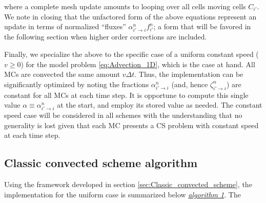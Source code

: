 \documentclass[11pt,titlepage]{report}
\begin{document}
\noindent where a complete mesh update amounts to looping over all cells moving cells $C_{i'}$. We note in closing that the unfactored form of the above equations represent an update in terms of normalized ``fluxes'' $\alpha_{i'\to i}^n f_{i'}^n$; a form that will be favored in the following section when higher order corrections are included.

Finally, we specialize the above to the specific case of a uniform constant speed ($v \geq 0$) for the model problem \eqref{eq:Advection_1D}, which is the case at hand. All MCs are convected the same amount $v\Delta t$. Thus, the implementation can be significantly optimized by noting the fractions $\alpha_{i'\to i}^n$ (and, hence $\zeta_{i'\to i}^n$) are constant for all MCs at each time step. It is opportune to compute this single value $\alpha \equiv \alpha_{i'\to i}^n$ at the start, and employ its stored value as needed. The constant speed case will be considered in all schemes with the understanding that no generality is lost given that each MC presents a CS problem with constant speed at each time step.

\newpage


\subsection{Classic convected scheme algorithm}

\indent\indent Using the framework developed in section \ref{sec:Classic_convected_scheme}, the implementation for the uniform case is summarized below \emph{\hyperlink{alg:1}{algorithm 1}}. The \\[0.3em]
\end{document}
